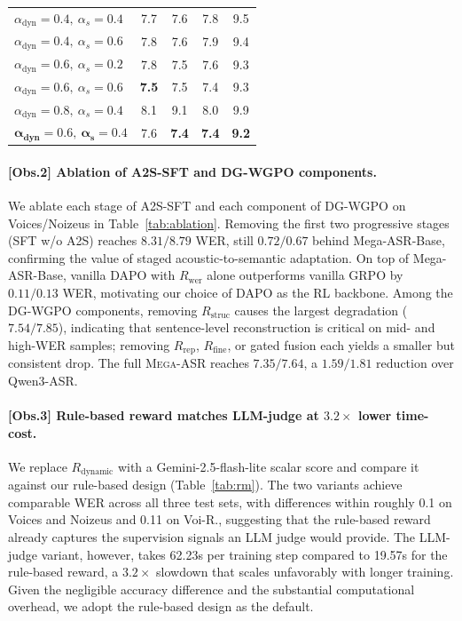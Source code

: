 \documentclass{llmxive}
\begin{document}
\begin{table}[t]
\begin{minipage}[t]{0.5\linewidth}
\begin{tabular}{lcccc}
\midrule
$\alpha_{\text{dyn}}{=}0.4,\ \alpha_s{=}0.4$ & 7.7 & 7.6 & 7.8 & 9.5 \\
$\alpha_{\text{dyn}}{=}0.4,\ \alpha_s{=}0.6$ & 7.8 & 7.6 & 7.9 & 9.4 \\
$\alpha_{\text{dyn}}{=}0.6,\ \alpha_s{=}0.2$ & 7.8 & 7.5 & 7.6 & 9.3 \\
$\alpha_{\text{dyn}}{=}0.6,\ \alpha_s{=}0.6$ & \textbf{7.5} & 7.5 & 7.4 & 9.3 \\
$\alpha_{\text{dyn}}{=}0.8,\ \alpha_s{=}0.4$ & 8.1 & 9.1 & 8.0 & 9.9 \\
$\boldsymbol{\alpha_{\text{dyn}}{=}0.6,\ \alpha_s{=}0.4}$ & 7.6 & \textbf{7.4} & \textbf{7.4} & \textbf{9.2} \\
\bottomrule
\end{tabular}
\end{minipage}
\vspace{-3mm}
\end{table}

\vspace{-2mm}

\paragraph{\textbf{[Obs.2] Ablation of A2S-SFT and DG-WGPO components.}}
We ablate each stage of A2S-SFT and each component of DG-WGPO on Voices/Noizeus in Table~\ref{tab:ablation}. Removing the first two progressive stages (SFT w/o A2S) reaches $8.31/8.79$ WER, still $0.72/0.67$ behind Mega-ASR-Base, confirming the value of staged acoustic-to-semantic adaptation. On top of Mega-ASR-Base, vanilla DAPO with $R_{\text{wer}}$ alone outperforms vanilla GRPO by $0.11/0.13$ WER, motivating our choice of DAPO as the RL backbone. Among the DG-WGPO components, removing $R_{\text{struc}}$ causes the largest degradation ($7.54/7.85$), indicating that sentence-level reconstruction is critical on mid- and high-WER samples; removing $R_{\text{rep}}$, $R_{\text{fine}}$, or gated fusion each yields a smaller but consistent drop. The full \textsc{Mega-ASR} reaches $7.35/7.64$, a $1.59/1.81$ reduction over Qwen3-ASR.

\vspace{-2mm}
\paragraph{\textbf{[Obs.3] Rule-based reward matches LLM-judge at \texorpdfstring{$3.2\times$}{3.2} lower time-cost.}}
We replace $R_\text{dynamic}$ with a Gemini-2.5-flash-lite scalar score and compare it against our rule-based design (Table~\ref{tab:rm}). The two variants achieve comparable WER across all three test sets, with differences within roughly 0.1 on Voices and Noizeus and 0.11 on Voi-R., suggesting that the rule-based reward already captures the supervision signals an LLM judge would provide. The LLM-judge variant, however, takes 62.23s per training step compared to 19.57s for the rule-based reward, a $3.2\times$ slowdown that scales unfavorably with longer training. Given the negligible accuracy difference and the substantial computational overhead, we adopt the rule-based design as the default.
\end{document}
